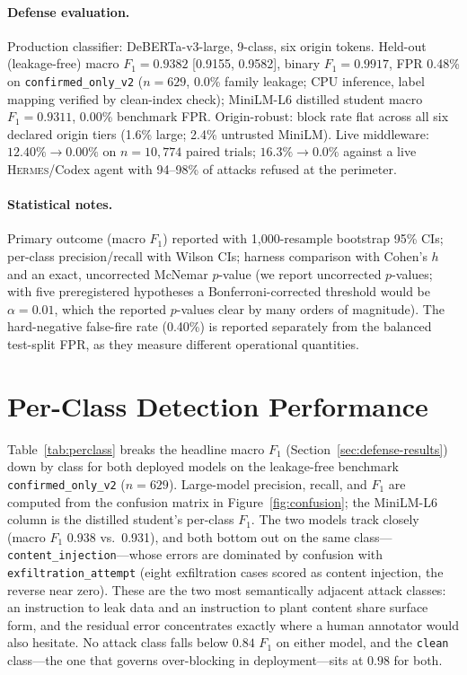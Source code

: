 \documentclass{article}
\newcommand{\hermes}{\textsc{Hermes}}
\begin{document}
\paragraph{Defense evaluation.}
Production classifier: DeBERTa-v3-large, 9-class, six origin tokens. Held-out (leakage-free) macro $F_1=0.9382$ [0.9155, 0.9582], binary $F_1=0.9917$, FPR 0.48\% on \texttt{confirmed\_only\_v2} ($n=629$, 0.0\% family leakage; CPU inference, label mapping verified by clean-index check); MiniLM-L6 distilled student macro $F_1=0.9311$, 0.00\% benchmark FPR. Origin-robust: block rate flat across all six declared origin tiers (1.6\% large; 2.4\% untrusted MiniLM). Live middleware: $12.40\%\to0.00\%$ on $n=10{,}774$ paired trials; $16.3\%\to0.0\%$ against a live \hermes{}/Codex agent with 94--98\% of attacks refused at the perimeter.

\paragraph{Statistical notes.}
Primary outcome (macro $F_1$) reported with 1{,}000-resample bootstrap 95\% CIs; per-class precision/recall with Wilson CIs; harness comparison with Cohen's $h$ and an exact, uncorrected McNemar $p$-value (we report uncorrected $p$-values; with five preregistered hypotheses a Bonferroni-corrected threshold would be $\alpha = 0.01$, which the reported $p$-values clear by many orders of magnitude). The hard-negative false-fire rate (0.40\%) is reported separately from the balanced test-split FPR, as they measure different operational quantities.

\section{Per-Class Detection Performance}

Table~\ref{tab:perclass} breaks the headline macro $F_1$ (Section~\ref{sec:defense-results}) down by class for both deployed models on the leakage-free benchmark \texttt{confirmed\_only\_v2} ($n=629$). Large-model precision, recall, and $F_1$ are computed from the confusion matrix in Figure~\ref{fig:confusion}; the MiniLM-L6 column is the distilled student's per-class $F_1$. The two models track closely (macro $F_1$ 0.938 vs.\ 0.931), and both bottom out on the same class---\texttt{content\_injection}---whose errors are dominated by confusion with \texttt{exfiltration\_attempt} (eight exfiltration cases scored as content injection, the reverse near zero). These are the two most semantically adjacent attack classes: an instruction to leak data and an instruction to plant content share surface form, and the residual error concentrates exactly where a human annotator would also hesitate. No attack class falls below $0.84$ $F_1$ on either model, and the \texttt{clean} class---the one that governs over-blocking in deployment---sits at $0.98$ for both.
\end{document}
